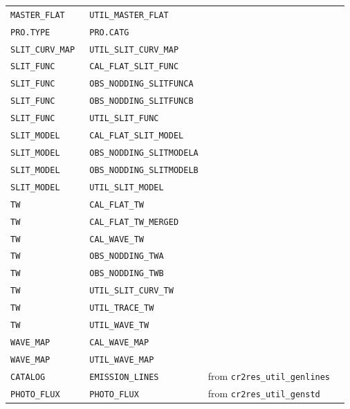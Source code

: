 \begin{tabularx}{\linewidth}{|X|X|X|X|}
\texttt{MASTER\_FLAT      } & \texttt{UTIL\_MASTER\_FLAT}            & \\
\texttt{PRO.TYPE         } & \texttt{PRO.CATG}                    & \\
\texttt{SLIT\_CURV\_MAP    } & \texttt{UTIL\_SLIT\_CURV\_MAP}          & \\
\texttt{SLIT\_FUNC        } & \texttt{CAL\_FLAT\_SLIT\_FUNC}          & \\
\texttt{SLIT\_FUNC        } & \texttt{OBS\_NODDING\_SLITFUNCA}       & \\
\texttt{SLIT\_FUNC        } & \texttt{OBS\_NODDING\_SLITFUNCB}       & \\
\texttt{SLIT\_FUNC        } & \texttt{UTIL\_SLIT\_FUNC}              & \\
\texttt{SLIT\_MODEL       } & \texttt{CAL\_FLAT\_SLIT\_MODEL}         & \\
\texttt{SLIT\_MODEL       } & \texttt{OBS\_NODDING\_SLITMODELA}      & \\
\texttt{SLIT\_MODEL       } & \texttt{OBS\_NODDING\_SLITMODELB}      & \\
\texttt{SLIT\_MODEL       } & \texttt{UTIL\_SLIT\_MODEL}             & \\
\texttt{TW               } & \texttt{CAL\_FLAT\_TW}                 & \\
\texttt{TW               } & \texttt{CAL\_FLAT\_TW\_MERGED}          & \\
\texttt{TW               } & \texttt{CAL\_WAVE\_TW}                 & \\
\texttt{TW               } & \texttt{OBS\_NODDING\_TWA}             & \\
\texttt{TW               } & \texttt{OBS\_NODDING\_TWB}             & \\
\texttt{TW               } & \texttt{UTIL\_SLIT\_CURV\_TW}           & \\
\texttt{TW               } & \texttt{UTIL\_TRACE\_TW}               & \\
\texttt{TW               } & \texttt{UTIL\_WAVE\_TW}                & \\
\texttt{WAVE\_MAP         } & \texttt{CAL\_WAVE\_MAP}                & \\
\texttt{WAVE\_MAP         } & \texttt{UTIL\_WAVE\_MAP}               & \\
\texttt{CATALOG  } & \texttt{EMISSION\_LINES}               & from \texttt{cr2res\_util\_genlines} \\
\texttt{PHOTO\_FLUX  } & \texttt{PHOTO\_FLUX}               &  from \texttt{cr2res\_util\_genstd} \\
\hline
\end{tabularx}
\label{tab:cal-prods}

